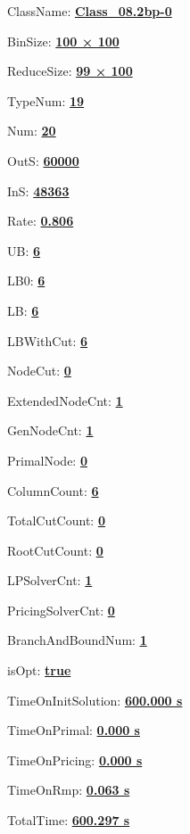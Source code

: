 \documentclass[11pt]{article}
\begin{document}
\pagestyle{empty}


ClassName: \underline{\textbf{Class_08.2bp-0}}
\par
BinSize: \underline{\textbf{100 × 100}}
\par
ReduceSize: \underline{\textbf{99 × 100}}
\par
TypeNum: \underline{\textbf{19}}
\par
Num: \underline{\textbf{20}}
\par
OutS: \underline{\textbf{60000}}
\par
InS: \underline{\textbf{48363}}
\par
Rate: \underline{\textbf{0.806}}
\par
UB: \underline{\textbf{6}}
\par
LB0: \underline{\textbf{6}}
\par
LB: \underline{\textbf{6}}
\par
LBWithCut: \underline{\textbf{6}}
\par
NodeCut: \underline{\textbf{0}}
\par
ExtendedNodeCnt: \underline{\textbf{1}}
\par
GenNodeCnt: \underline{\textbf{1}}
\par
PrimalNode: \underline{\textbf{0}}
\par
ColumnCount: \underline{\textbf{6}}
\par
TotalCutCount: \underline{\textbf{0}}
\par
RootCutCount: \underline{\textbf{0}}
\par
LPSolverCnt: \underline{\textbf{1}}
\par
PricingSolverCnt: \underline{\textbf{0}}
\par
BranchAndBoundNum: \underline{\textbf{1}}
\par
isOpt: \underline{\textbf{true}}
\par
TimeOnInitSolution: \underline{\textbf{600.000 s}}
\par
TimeOnPrimal: \underline{\textbf{0.000 s}}
\par
TimeOnPricing: \underline{\textbf{0.000 s}}
\par
TimeOnRmp: \underline{\textbf{0.063 s}}
\par
TotalTime: \underline{\textbf{600.297 s}}
\par
\newpage


\end{document}
